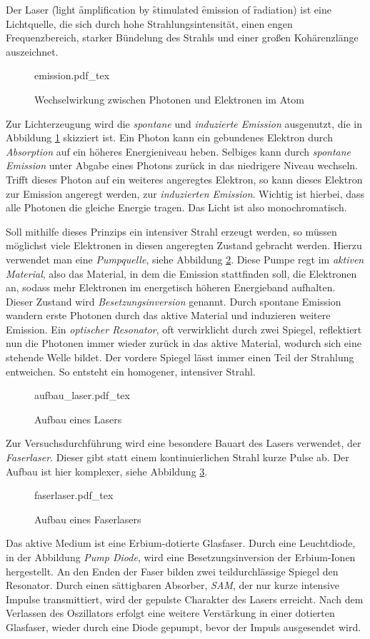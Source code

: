 Der Laser (\f light \f amplification by \f stimulated \f emission of \f radiation)
ist eine Lichtquelle, die sich durch hohe Strahlungsintensität, einen engen 
Frequenzbereich, starker Bündelung des Strahls und einer großen Kohärenzlänge 
auszeichnet.
\begin{figure}[h]
  \centering
    {emission.pdf_tex}
  \caption{Wechselwirkung zwischen Photonen und Elektronen im Atom}
  \label{abb:emission}
\end{figure}
Zur Lichterzeugung wird die \emph{spontane} und \emph{induzierte Emission} 
ausgenutzt, die in Abbildung \ref{abb:emission} skizziert ist. Ein Photon kann
ein gebundenes Elektron durch \emph{Absorption} auf ein höheres Energieniveau 
heben. Selbiges kann durch \emph{spontane Emission} unter Abgabe eines Photons
zurück in das niedrigere Niveau wechseln. Trifft dieses Photon auf ein weiteres
angeregtes Elektron, so kann dieses Elektron zur Emission angeregt werden, zur
\emph{induzierten Emission}. Wichtig ist hierbei, dass alle Photonen die gleiche
Energie tragen. Das Licht ist also monochromatisch. \par
Soll mithilfe dieses Prinzips ein intensiver Strahl erzeugt werden, so müssen 
möglichst viele Elektronen in diesen angeregten Zustand gebracht werden. Hierzu
verwendet man eine \emph{Pumpquelle}, siehe Abbildung \ref{abb:aufbau_laser}.
Diese Pumpe regt im \emph{aktiven Material},
also das Material, in dem die Emission stattfinden soll, die Elektronen an, sodass
mehr Elektronen im energetisch höheren Energieband aufhalten. Dieser Zustand wird
\emph{Besetzungsinversion} genannt. Durch spontane Emission wandern erste Photonen
durch das aktive Material und induzieren weitere Emission. 
Ein \emph{optischer Resonator}, oft verwirklicht durch zwei Spiegel, reflektiert nun
die Photonen immer wieder zurück in das aktive Material, wodurch sich eine stehende
Welle bildet. Der vordere Spiegel lässt immer einen Teil der Strahlung entweichen.
So entsteht ein homogener, intensiver Strahl. 
\begin{figure}[h]
  \centering
  {aufbau_laser.pdf_tex}
  \caption{Aufbau eines Lasers}
  \label{abb:aufbau_laser}
\end{figure}

Zur Versuchsdurchführung wird eine besondere Bauart des Lasers verwendet, der 
\emph{Faserlaser}. Dieser gibt statt einem kontinuierlichen Strahl kurze Pulse ab.
Der Aufbau ist hier komplexer, siehe Abbildung \ref{abb:faser}.
\begin{figure}[h]
  \centering
  {faserlaser.pdf_tex}
  \caption{Aufbau eines Faserlasers}
  \label{abb:faser}
\end{figure}
Das aktive Medium ist eine Erbium-dotierte Glasfaser. Durch eine Leuchtdiode, in der
Abbildung \emph{Pump Diode}, wird eine Besetzungsinversion der Erbium-Ionen
hergestellt. An den Enden der Faser bilden zwei teildurchlässige Spiegel den 
Resonator. Durch einen sättigbaren Absorber, \emph{SAM}, der nur kurze intensive
Impulse transmittiert, wird der gepulste Charakter des Lasers erreicht. Nach dem 
Verlassen des Oszillators erfolgt eine weitere Verstärkung in einer dotierten 
Glasfaser, wieder durch eine Diode gepumpt, bevor der Impuls ausgesendet wird. 
\autocite{phying, zinth}

